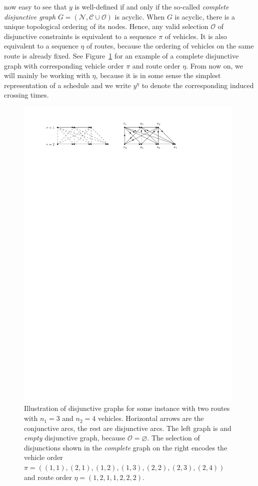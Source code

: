 \documentclass[a4paper]{report}
\theoremstyle{definition}
\theoremstyle{plain}
\begin{document}
now easy to see that $y$ is well-defined if and only if the so-called \textit{complete disjunctive graph}
$G=(\mathcal{N}, \mathcal{C} \cup \mathcal{O})$ is acyclic.
%
When $G$ is acyclic, there is a unique topological ordering of its nodes. Hence,
any valid selection $\mathcal{O}$ of disjunctive constraints is equivalent to a
sequence $\pi$ of vehicles. It is also equivalent to a sequence $\eta$ of routes,
because the ordering of vehicles on the same route is already fixed. See
Figure~\ref{fig:disjunctive_graphs} for an example of a complete disjunctive
graph with corresponding vehicle order $\pi$ and route order $\eta$.
%
From now on, we will mainly be working with $\eta$, because it is in some sense the
simplest representation of a schedule and we write $y^{\eta}$ to denote the
corresponding induced crossing times.

\begin{figure}
  \centering
  \includegraphics[width=0.98\textwidth]{figures/single/disjunctive_graph.pdf}
  \caption{Illustration of disjunctive graphs for some instance with two routes
    with $n_{1} = 3$ and $n_{2} = 4$ vehicles. Horizontal arrows are the
    conjunctive arcs, the rest are disjunctive arcs. The left graph is and
    \textit{empty} disjunctive graph, because $\mathcal{O} = \varnothing$. The
    selection of disjunctions shown in the \textit{complete} graph on the right
    encodes the vehicle order
    $\pi = ((1,1), (2,1), (1,2), (1,3), (2,2), (2,3), (2,4))$ and route order
    $\eta = (1, 2, 1, 1, 2, 2, 2)$.}
  \label{fig:disjunctive_graphs}
\end{figure}
\end{document}
